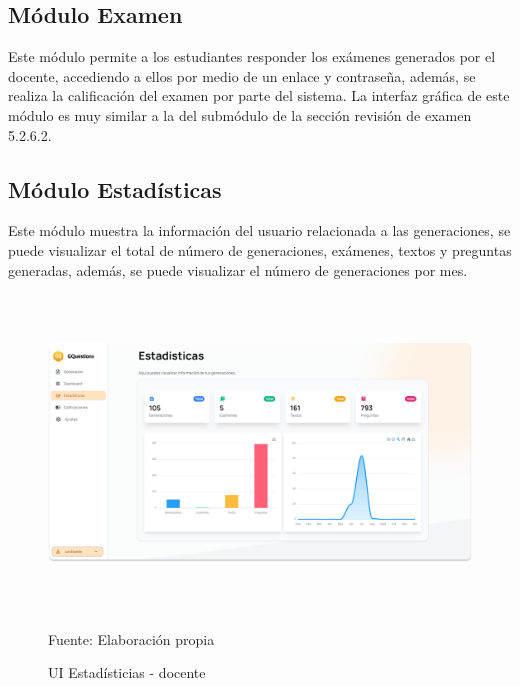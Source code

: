 \documentclass[../Main.tex]{subfiles}
\begin{document}
    \subsection{Módulo Examen}
    \begin{justify}
    Este módulo permite a los estudiantes responder los exámenes generados por el docente, accediendo a ellos por medio de un enlace y contraseña, además, se realiza la calificación del examen por parte del sistema. La interfaz gráfica de este módulo es muy similar a la del submódulo de la sección revisión de examen 5.2.6.2.
    \end{justify}
    
    \subsection{Módulo Estadísticas}
    \begin{justify}
    Este módulo muestra la información del usuario relacionada a las generaciones, se puede visualizar el total de número de generaciones, exámenes, textos y preguntas generadas, además, se puede visualizar el número de generaciones por mes. 
    \end{justify}
    
    \begin{figure}[H]
	\begin{Center}
		\includegraphics[width=6.4in,height=3.3in]{Images/ui_docente_estadisticas.png}
	    \caption{UI Estadísticias - docente}
	    Fuente: Elaboración propia
        \label{fig:section}
	\end{Center}
    \end{figure}
    
\end{document}
